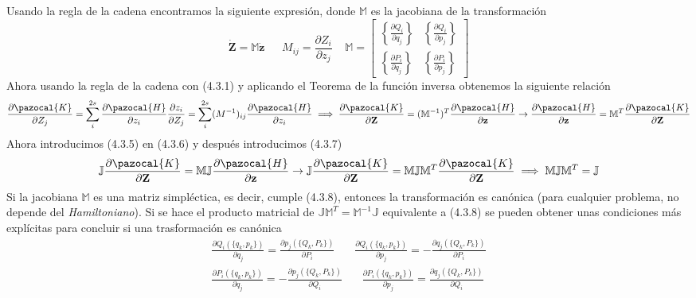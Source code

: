 Usando la regla de la cadena encontramos la siguiente expresión, donde $\mathbb{M}$ es la jacobiana de la transformación
\begin{equation} \label{4.2.7}
    \dot{\mathbf{Z}} = \mathbb{M}\dot{\mathbf{z}}  \ \ \ \ \ \ \ M_{ij} = \frac{\partial Z_i}{\partial z_j} \ \ \ \ \ \mathbb{M} = \left[\begin{array}{cc} \left\{\frac{\partial Q_i}{\partial q_j}\right\} & \left\{\frac{\partial Q_i}{\partial p_j}\right\} \\  \left\{\frac{\partial P_i}{\partial q_j}\right\} & \left\{\frac{\partial P_i}{\partial p_j}\right\} \end{array}\right]
\end{equation} 
Ahora usando la regla de la cadena con (4.3.1) y aplicando el Teorema de la función inversa obtenemos la siguiente relación 
\begin{equation} \label{4.2.7}
    \frac{\partial \pazocal{K}}{\partial Z_j} = \sum_i^{2s} \frac{\partial \pazocal{H}}{\partial z_i} \frac{\partial z_i}{\partial Z_j} = \sum_i^{2s} ({M^{-1}})_{ij} \frac{\partial \pazocal{H}}{\partial z_i} \implies \frac{\partial \pazocal{K}}{\partial \mathbf{Z}} = (\mathbb{M}^{-1})^T \frac{\partial \pazocal{H}}{\partial \mathbf{z}} \rightarrow  \frac{\partial \pazocal{H}}{\partial \mathbf{z}}  = \mathbb{M}^T \frac{\partial \pazocal{K}}{\partial \mathbf{Z}}
\end{equation} 
Ahora introducimos (4.3.5) en (4.3.6) y después introducimos (4.3.7)
\begin{equation} \label{4.2.7}
    \mathbb{J} \frac{\partial \pazocal{K}}{\partial \mathbf{Z}} = \mathbb{M}\mathbb{J} \frac{\partial \pazocal{H}}{\partial \mathbf{z}} \rightarrow \mathbb{J} \frac{\partial \pazocal{K}}{\partial \mathbf{Z}} = \mathbb{M}\mathbb{J} \mathbb{M}^T \frac{\partial \pazocal{K}}{\partial \mathbf{Z}} \implies \mathbb{M}\mathbb{J} \mathbb{M}^T = \mathbb{J} 
\end{equation} 
Si la jacobiana $\mathbb{M}$ es una matriz simpléctica, es decir, cumple (4.3.8), entonces la transformación es canónica (para cualquier problema, no depende del \textit{Hamiltoniano}).
Si se hace el producto matricial de $\mathbb{J} \mathbb{M}^T = \mathbb{M}^{-1}\mathbb{J}$ equivalente a (4.3.8) se pueden obtener unas condiciones más explícitas para concluir si una trasformación es canónica
\begin{equation} \label{4.2.7}
    \begin{split}
        \frac{\partial Q_i(\{q_k,p_k\})}{\partial q_j} = \frac{\partial p_j(\{Q_k,P_k\})}{\partial P_i} \ \ \ \ \ \ \ \ \frac{\partial Q_i(\{q_k,p_k\})}{\partial p_j} = -\frac{\partial q_j(\{Q_k,P_k\})}{\partial P_i} \\ 
        \frac{\partial P_i(\{q_k,p_k\})}{\partial q_j} = -\frac{\partial p_j(\{Q_k,P_k\})}{\partial Q_i} \ \ \ \ \ \ \ \ \frac{\partial P_i(\{q_k,p_k\})}{\partial p_j} = \frac{\partial q_j(\{Q_k,P_k\})}{\partial Q_i}
    \end{split}
\end{equation} 
